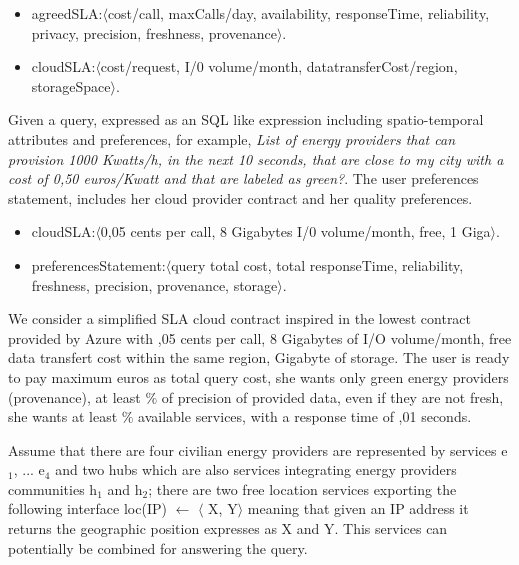 \begin{itemize}
\sf\footnotesize
 \item {\sf agreedSLA:$\langle$cost/call, maxCalls/day, availability, responseTime, reliability, privacy, precision, freshness, provenance$\rangle$}. 
 
 \item  {\sf cloudSLA:$\langle$cost/request, I/0 volume/month, datatransferCost/region, storageSpace$\rangle$}. 
 \end{itemize}
 

 Given a query, expressed as an SQL like expression including spatio-temporal attributes and preferences, for example, {\em List of energy providers that can provision 1000 Kwatts/h, in the next 10 seconds, that are close to my city with a cost of 0,50 euros/Kwatt and that are labeled as green?}. The user preferences statement, includes her cloud provider contract and her quality preferences. 
 \begin{itemize}
\sf\footnotesize
 
 \item  {\sf cloudSLA:$\langle$0,05 cents per call, 8 Gigabytes I/0 volume/month, free, 1 Giga$\rangle$}. 
 
 \item {\sf preferencesStatement:$\langle$query total cost,  total responseTime, reliability, freshness, precision, provenance, storage$\rangle$}. 
 
 \end{itemize}
 We consider a simplified SLA cloud contract inspired in the lowest contract provided by Azure with {,05 cents per call,  8 Gigabytes of I/O volume/month, free data transfert cost within the same region,  Gigabyte of storage}. The user is ready to pay maximum { euros as total query cost}, she wants only {\sf green} energy providers (provenance), at least {$\%$} of precision of provided data, even if they are not fresh, she wants at least {$\%$} available services, with a response time of {,01 seconds}.
 
 Assume that there are four civilian energy providers are represented by services  {\sf e$_1$, ... e$_4$} and two {\sf hub}s which are also services integrating energy providers communities {\sf h$_1$ and h$_2$}; there are two free location services exporting  the following interface {\sf loc(IP) $\leftarrow$ $\langle$ X, Y$\rangle$} meaning that given an IP address it returns the geographic position expresses as {\sf X} and {\sf Y}. This services can potentially be combined for answering the query. 
 

